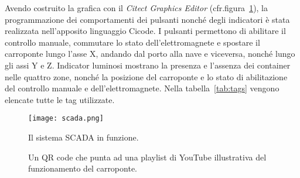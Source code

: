 Avendo costruito la grafica con il \emph{Citect Graphics Editor} (cfr.\@ figura~\ref{fig:scada}), la
programmazione dei comportamenti dei pulsanti nonché degli indicatori è stata realizzata
nell'apposito linguaggio Cicode. I pulsanti permettono di abilitare il controllo manuale, commutare
lo stato dell'elettromagnete e spostare il carroponte lungo l'asse X, andando dal porto alla nave e
viceversa, nonché lungo gli assi Y e Z. Indicator luminosi mostrano la presenza e l'assenza dei
container nelle quattro zone, nonché la posizione del carroponte e lo stato di abilitazione del
controllo manuale e dell'elettromagnete. Nella tabella~\ref{tab:tags} vengono elencate tutte le tag
utilizzate.

\begin{figure}[htbp]\centering
    \caption{Il sistema SCADA in funzione.}\label{fig:scada}
    \texttt{[image: scada.png]}
\end{figure}

\begin{figure}[htbp]\centering
    \caption{Un QR code che punta ad una playlist di YouTube illustrativa del funzionamento del carroponte.}\label{fig:qrcode}
\end{figure}

